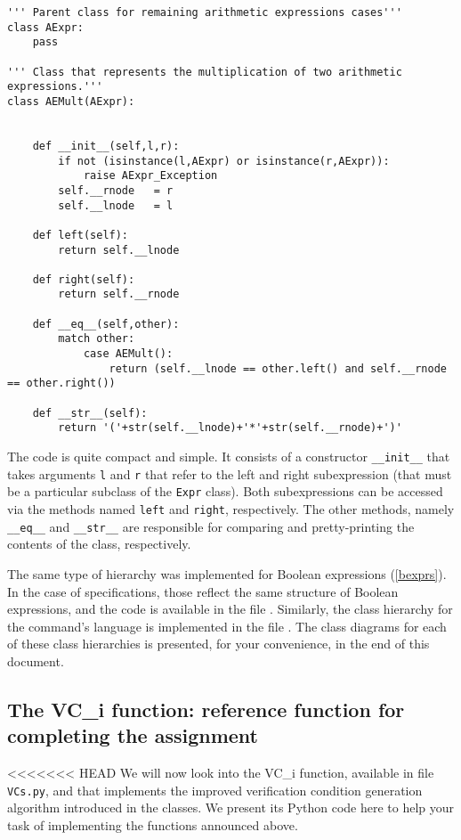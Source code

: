 \documentclass[11pt]{article}
\begin{document}
\begin{lstlisting}[style=Python]
''' Parent class for remaining arithmetic expressions cases'''
class AExpr:
    pass

''' Class that represents the multiplication of two arithmetic expressions.'''
class AEMult(AExpr):


    def __init__(self,l,r):
        if not (isinstance(l,AExpr) or isinstance(r,AExpr)):
            raise AExpr_Exception
        self.__rnode   = r
        self.__lnode   = l

    def left(self):
        return self.__lnode

    def right(self):
        return self.__rnode

    def __eq__(self,other):
        match other:
            case AEMult():
                return (self.__lnode == other.left() and self.__rnode == other.right())

    def __str__(self):
        return '('+str(self.__lnode)+'*'+str(self.__rnode)+')'  
\end{lstlisting}
The code is quite compact and simple. It consists of a constructor \lstinline!__init__! that takes arguments \lstinline!l! and \lstinline!r! that refer to the left and right subexpression (that must be a particular subclass of the \lstinline!Expr! class). Both subexpressions can be accessed via the methods named \lstinline!left! and \lstinline!right!, respectively. The other methods, namely \lstinline!__eq__! and \lstinline!__str__! are responsible for comparing and pretty-printing the contents of the class, respectively.


The same type of hierarchy was implemented for Boolean expressions (\cref{bexprs}). In the case of specifications, those reflect the same structure of Boolean expressions, and the code is available in the file . Similarly, the class hierarchy for the command's language is implemented in the file . The class diagrams for each of these class hierarchies is presented, for your convenience, in the end of this document.

\subsection{The VC\_i function: reference function for completing the assignment}

<<<<<<< HEAD
We will now look into the VC\_i function, available in file \texttt{VCs.py}, and that implements the improved verification condition generation algorithm introduced in the classes. We present its Python code here to help your task of implementing the functions announced above.
\end{document}
